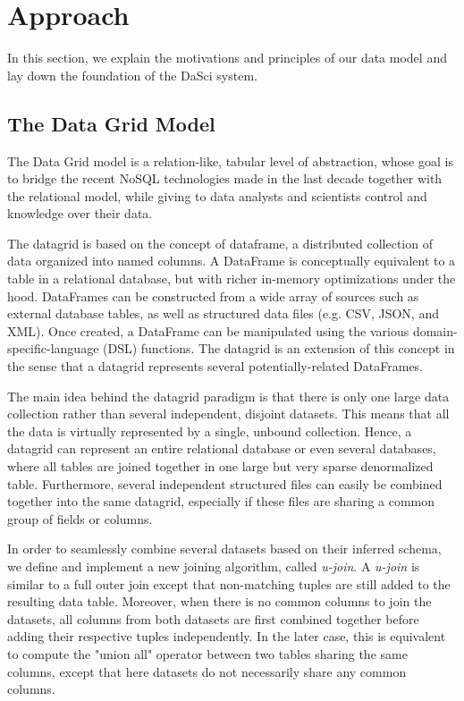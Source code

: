\documentclass[10pt, a4paper, twocolumn]{article} %
\begin{document}
\section{Approach}
\label{section:approach}

In this section, we explain the motivations and principles of our data model and lay down the foundation of the DaSci system.


\subsection{The Data Grid Model}
\label{subsection:data-grid}

The Data Grid model is a relation-like, tabular level of abstraction, whose goal is to bridge the recent NoSQL technologies made in the last decade together with the relational model, while giving to data analysts and scientists control and knowledge over their data. 

The datagrid is based on the concept of dataframe, a distributed collection of data organized into named columns. A DataFrame is conceptually equivalent to a table in a relational database, but with richer in-memory optimizations under the hood\cite{spark}. DataFrames can be constructed from a wide array of sources such as external database tables, as well as structured data files (e.g. CSV, JSON, and XML).
Once created, a DataFrame can be manipulated using the various domain-specific-language (DSL) functions.
The datagrid is an extension of this concept in the sense that a datagrid represents several potentially-related DataFrames.

The main idea behind the datagrid paradigm is that there is only one large data collection rather than several independent, disjoint datasets. This means that all the data is virtually represented by a single, unbound collection.
Hence, a datagrid can represent an entire relational database or even several databases, where all tables are joined together in one large but very sparse denormalized table.
Furthermore, several independent structured files can easily be combined together into the same datagrid, especially if these files are sharing a common group of fields or columns.

In order to seamlessly combine several datasets based on their inferred schema, we define and implement a new joining algorithm, called \textit{u-join}.
A \textit{u-join} is similar to a full outer join except that non-matching tuples are still added to the resulting data table. 
Moreover, when there is no common columns to join the datasets, all columns from both datasets are first combined together before adding their respective tuples independently. In the later case, this is equivalent to compute the "union all" operator between two tables sharing the same columns, except that here datasets do not necessarily share any common columns.
\end{document}
